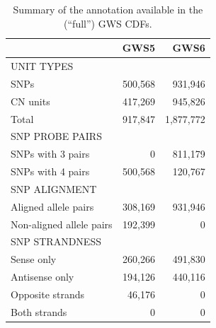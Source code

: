 \documentclass{bioinfo}
\newcommand{\GWS}{GWS\xspace}
\newcommand{\GWSFive}{GWS5\xspace}
\newcommand{\GWSSix}{GWS6\xspace}
\begin{document}
\begin{table}[hp]
\begin{center}
{\footnotesize
\begin{tabular}{|l|rr|}
\hline
                         & \GWSFive  & \GWSSix   \\
\hline
\hline
UNIT TYPES               &           &           \\
SNPs                     &  500,568  &   931,946 \\
CN units                 &  417,269  &   945,826 \\
Total                    &  917,847  & 1,877,772 \\
\hline
SNP PROBE PAIRS          &           &   	 \\
SNPs with 3 pairs        &        0  &   811,179 \\
SNPs with 4 pairs        &  500,568  &   120,767 \\
\hline
SNP ALIGNMENT	         &           &           \\
Aligned allele pairs     &  308,169  &   931,946 \\
Non-aligned allele pairs &  192,399  &         0 \\
\hline
SNP STRANDNESS		 &  	     &           \\
Sense only               &  260,266  &   491,830 \\
Antisense only           &  194,126  &   440,116 \\
Opposite strands         &   46,176  &         0 \\
Both strands             &        0  &         0 \\
\hline
\end{tabular}
}
\end{center}
\caption{Summary of the annotation available in the (``full'') \GWS CDFs.}%
\label{tblCdfUnitsBrief}
\end{table}
\end{document}
